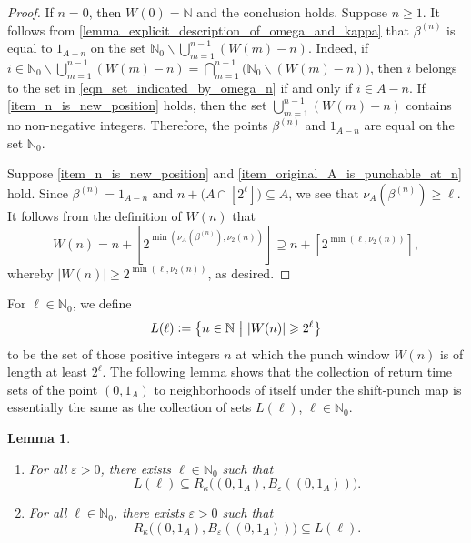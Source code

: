 \documentclass[letter,11pt]{article}
\theoremstyle{plain}
\newtheorem{lemma}[theorem]{Lemma}
\theoremstyle{definition}
\theoremstyle{plain}
\theoremstyle{plain}
\numberwithin{equation}{section}
\newcommand{\eps}{\epsilon}
\newcommand{\N}{\mathbb{N}}
\newcommand{\defeq}{\vcentcolon=}
\renewcommand{\epsilon}{\varepsilon}
\renewcommand{\geq}{\geqslant}
\renewcommand{\setminus}{\backslash}
\newcommand{\bpunch}{\beta}
\begin{document}
\begin{proof}
    If $n = 0$, then $W(0) = \N$ and the conclusion holds.  Suppose $n \geq 1$.  It follows from \cref{lemma_explicit_description_of_omega_and_kappa} that $\bpunch^{(n)}$ is equal to $1_{A-n}$ on the set $\N_0 \setminus \bigcup_{m=1}^{n-1} (W(m) - n)$. Indeed, if $i \in \N_0 \setminus \bigcup_{m=1}^{n-1} (W(m) - n) = \bigcap_{m=1}^{n-1} \big( \N_0 \setminus (W(m) - n) \big)$, then $i$ belongs to the set in \eqref{eqn_set_indicated_by_omega_n} if and only if $i \in A-n$. If \eqref{item_n_is_new_position} holds, then the set $\bigcup_{m=1}^{n-1} (W(m) - n)$ contains no non-negative integers.  Therefore, the points $\bpunch^{(n)}$ and $1_{A-n}$ are equal on the set $\N_0$.

    Suppose \eqref{item_n_is_new_position} and \eqref{item_original_A_is_punchable_at_n} hold. Since $\bpunch^{(n)} = 1_{A-n}$ and $n + \big(A \cap [2^{\ell}]\big) \subseteq A$, we see that $\nu_A(\bpunch^{(n)}) \geq \ell$.  It follows from the definition of $W(n)$ that
    \[W(n) = n + [2^{\min(\nu_A(\bpunch^{(n)}),\nu_2(n))}] \supseteq n + [2^{\min(\ell,\nu_2(n))}],\]
    whereby $|W(n)| \geq 2^{\min(\ell,\nu_2(n))}$, as desired.
\end{proof}


For $\ell \in \N_0$, we define
\[L(\ell) \defeq \big\{n \in \N \ \big| \ |W(n)| \geq 2^\ell \big\}\]
to be the set of those positive integers $n$ at which the punch window $W(n)$ is of length at least $2^\ell$.  The following lemma shows that the collection of return time sets of the point $(0,1_A)$ to neighborhoods of itself under the shift-punch map is essentially the same as the collection of sets $L(\ell)$, $\ell \in \N_0$.


\begin{lemma} \leavevmode
\label{lemma_punch_windows_and_return_times}
    \begin{enumerate}
        \item \label{item_Lell_contained_in_return_times}
        For all $\eps > 0$, there exists $\ell \in \N_0$ such that
        \[L(\ell) \subseteq R_{\kappa}\big((0,1_A),B_{\eps}((0,1_A))\big).\]

        \item \label{item_return_times_contained_in_Lell}
        For all $\ell \in \N_0$, there exists $\eps > 0$ such that
        \[R_{\kappa}\big((0,1_A),B_{\eps}((0,1_A))\big) \subseteq L(\ell).\]
    \end{enumerate}
\end{lemma}
\end{document}
